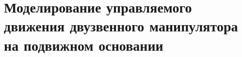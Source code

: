 \section{Моделирование управляемого движения  двузвенного манипулятора на подвижном основании} \label{p32}